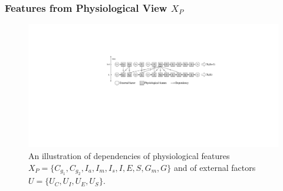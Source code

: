 \subsubsection{Features from Physiological View $X_P$}
\label{subsubsec:physiological}
\begin{figure}[h]
  \centering
  \includegraphics[width=0.9\columnwidth]{./img/Physiological_correlation2.pdf}
  \caption{An illustration of dependencies of physiological features $X_P=\{C_{g_1}, C_{g_2}, I_{a}, I_{m}, I_{s}, I, E, S,  G_{m}, G\}$ and of external factors $U=\{U_C, U_I, U_E, U_S\}$.}
  \label{fig:phymodel}
\end{figure}
